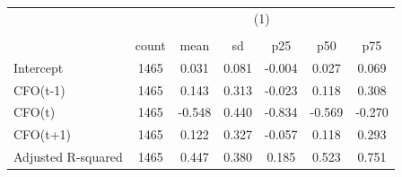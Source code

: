 {
\def\sym#1{\ifmmode^{#1}\else\(^{#1}\)\fi}
\begin{tabular}{l*{1}{cccccc}}
\hline\hline
                    &\multicolumn{6}{c}{(1)}                                                      \\
                    &\multicolumn{6}{c}{}                                                         \\
                    &       count&        mean&          sd&         p25&         p50&         p75\\
\hline
Intercept           &        1465&       0.031&       0.081&      -0.004&       0.027&       0.069\\
CFO(t-1)            &        1465&       0.143&       0.313&      -0.023&       0.118&       0.308\\
CFO(t)              &        1465&      -0.548&       0.440&      -0.834&      -0.569&      -0.270\\
CFO(t+1)            &        1465&       0.122&       0.327&      -0.057&       0.118&       0.293\\
Adjusted R-squared  &        1465&       0.447&       0.380&       0.185&       0.523&       0.751\\
\hline\hline
\end{tabular}
}
